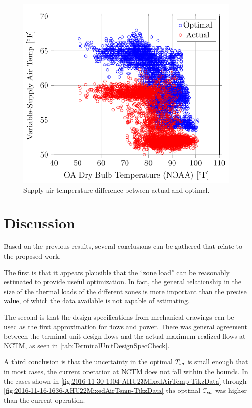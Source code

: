 \begin{figure}
\centering
\includegraphics[]{Plots/2017-01-25-1121-VariableSupplyAirTempvsOADryBulbTemperatureNOAA.pdf}
\caption{Supply air temperature difference between actual and optimal.}
\label{fig:2017-01-25-1121-VariableSupplyAirTempvsOADryBulbTemperatureNOAA}
\end{figure}

\section{Discussion}

Based on the previous results, several conclusions can be gathered that
relate to the proposed work.

The first is that it appears plausible that the ``zone load'' can be
reasonably estimated to provide useful optimization.  In fact, the
general relationship in the size of the thermal loads of the different
zones is more important than the precise value, of which the data
available is not capable of estimating. 

The second is that the design specifications from mechanical drawings
can be used as the first approximation for flows and power.  There was
general agreement between the terminal unit design flows and the actual
maximum realized flows at NCTM, as seen in \tableref{}
\ref{tab:TerminalUnitDesignSpecCheck}. 

A third conclusion is that the uncertainty in the optimal \(T_{sa}\) is
small enough that in most cases, the current operation at NCTM does not
fall within the bounds.  In the cases shown in \figref{}
\ref{fig:2016-11-30-1004-AHU23MixedAirTemp-TikzData} through \figref{}
\ref{fig:2016-11-16-1636-AHU22MixedAirTemp-TikzData} the optimal
\(T_{sa}\) was higher than the current operation. 
